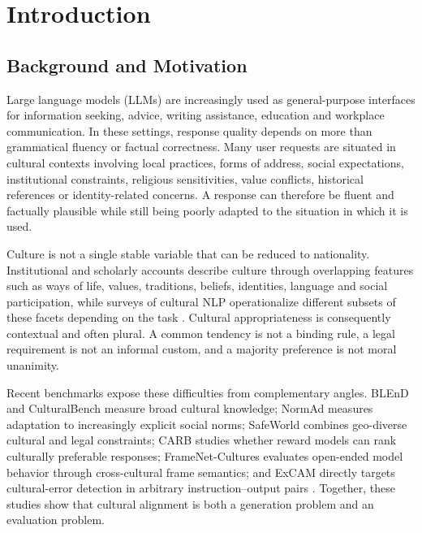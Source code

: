\chapter{Introduction}
\label{ch:introduction}

\section{Background and Motivation}
Large language models (LLMs) are increasingly used as general-purpose interfaces for information seeking, advice, writing assistance, education and workplace communication. In these settings, response quality depends on more than grammatical fluency or factual correctness. Many user requests are situated in cultural contexts involving local practices, forms of address, social expectations, institutional constraints, religious sensitivities, value conflicts, historical references or identity-related concerns. A response can therefore be fluent and factually plausible while still being poorly adapted to the situation in which it is used.

Culture is not a single stable variable that can be reduced to nationality. Institutional and scholarly accounts describe culture through overlapping features such as ways of life, values, traditions, beliefs, identities, language and social participation, while surveys of cultural NLP operationalize different subsets of these facets depending on the task \parencite{unesco2001culturaldiversity,cescr2009gc21,adilazuarda2024culture,liu2025culturallyaware,pawar2025culturalawareness}. Cultural appropriateness is consequently contextual and often plural. A common tendency is not a binding rule, a legal requirement is not an informal custom, and a majority preference is not moral unanimity.

Recent benchmarks expose these difficulties from complementary angles. BLEnD and CulturalBench measure broad cultural knowledge; NormAd measures adaptation to increasingly explicit social norms; SafeWorld combines geo-diverse cultural and legal constraints; CARB studies whether reward models can rank culturally preferable responses; FrameNet-Cultures evaluates open-ended model behavior through cross-cultural frame semantics; and ExCAM directly targets cultural-error detection in arbitrary instruction--output pairs \parencite{myung2024blend,chiu2025culturalbench,rao2025normad,yin2024safeworld,zhang2026carb,jamshidi2026framenet,leiter2026excam}. Together, these studies show that cultural alignment is both a generation problem and an evaluation problem.


